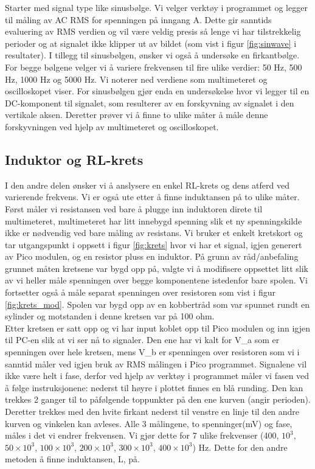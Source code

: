 \documentclass[norsk,a4paper,12pt]{article}
\begin{document}
Starter med signal type like sinusbølge. Vi velger verktøy i programmet og legger til måling av AC RMS for spenningen på inngang A. Dette gir sanntids evaluering av RMS verdien og vil være veldig presis så lenge vi har tilstrekkelig perioder og at signalet ikke klipper ut av bildet (som vist i figur \ref{fig:sinwave} i resultater). I tillegg til sinusbølgen, ønsker vi også å undersøke en firkantbølge. For begge bølgene velger vi å variere frekvensen til fire ulike verdier: 50 Hz, 500 Hz, 1000 Hz og 5000 Hz. Vi noterer ned verdiene som multimeteret og oscilloskopet viser. For sinusbølgen gjør enda en undersøkelse hvor vi legger til en DC-komponent til signalet, som resulterer av en forskyvning av signalet i den vertikale aksen. Deretter prøver vi å finne to ulike måter å måle denne forskyvningen ved hjelp av multimeteret og oscilloskopet. 



\subsection{Induktor og RL-krets}
I den andre delen ønsker vi å anslysere en enkel RL-krets og dens atferd ved varierende frekvens. Vi er også ute etter å finne induktansen på to ulike måter. Først måler vi resistansen ved bare å plugge inn induktoren direte til multimeteret, multimeteret har litt innebygd spenning slik et ny spenningskilde ikke er nødvendig ved bare måling av resistans. Vi bruker et enkelt kretskort og tar utgangspunkt i oppsett i figur \ref{fig:krets} hvor vi har et signal, igjen generert av Pico modulen, og en resistor pluss en induktor. På grunn av råd/anbefaling grunnet måten kretsene var bygd opp på, valgte vi å modifisere oppsettet litt slik av vi heller måle spenningen over begge komponentene istedenfor bare spolen. Vi fortsetter også å måle separat spenningen over resistoren som vist i figur \ref{fig:krets_mod}. Spolen var bygd opp av en kobbertråd som var spunnet rundt en sylinder og motstanden i denne kretsen var på 100 ohm.  \\

Etter kretsen er satt opp og vi har input koblet opp til Pico modulen og inn igjen til PC-en slik at vi ser nå to signaler. Den ene har vi kalt for V\_a som er spenningen over hele kretsen, mens V\_b er spenningen over resistoren som vi i sanntid måler ved igjen bruk av RMS målingen i Pico programmet. Signalene vil ikke være helt i fase, derfor ved hjelp av verktøy i programmet måler vi fasen ved å følge instruksjonene: nederst til høyre i plottet finnes en blå runding. Den kan trekkes 2 ganger til to påfølgende toppunkter på den ene kurven (angir perioden). Deretter trekkes med den hvite firkant nederst til venstre en linje til den andre kurven og vinkelen kan avleses. Alle 3 målingene, to spenninger(mV) og fase, måles i det vi endrer frekvensen. Vi gjør dette for 7 ulike frekvenser (400, $10^3$, $50 \times 10^3$, $100 \times 10^3$, $200 \times 10^3$, $300 \times 10^3$, $400 \times 10^3$) Hz. Dette for den andre metoden å finne induktansen, L, på. \\
\end{document}
